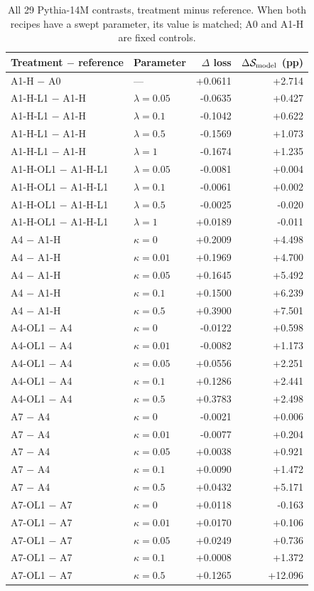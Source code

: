 \begin{table}[p]\centering\small\renewcommand{\arraystretch}{0.95}
\caption{All 29 Pythia-14M contrasts, treatment minus reference. When both recipes have a swept parameter, its value is matched; A0 and A1-H are fixed controls.}\label{tab:paired-effects-full}
\begin{tabular}{@{}llrr@{}}
\toprule
Treatment $-$ reference & Parameter & $\Delta$ loss & $\Delta\mathcal{S}_{\mathrm{model}}$ (pp) \\
\midrule
A1-H $-$ A0 & --- & +0.0611 & +2.714 \\
A1-H-L1 $-$ A1-H & $\lambda=0.05$ & -0.0635 & +0.427 \\
A1-H-L1 $-$ A1-H & $\lambda=0.1$ & -0.1042 & +0.622 \\
A1-H-L1 $-$ A1-H & $\lambda=0.5$ & -0.1569 & +1.073 \\
A1-H-L1 $-$ A1-H & $\lambda=1$ & -0.1674 & +1.235 \\
A1-H-OL1 $-$ A1-H-L1 & $\lambda=0.05$ & -0.0081 & +0.004 \\
A1-H-OL1 $-$ A1-H-L1 & $\lambda=0.1$ & -0.0061 & +0.002 \\
A1-H-OL1 $-$ A1-H-L1 & $\lambda=0.5$ & -0.0025 & -0.020 \\
A1-H-OL1 $-$ A1-H-L1 & $\lambda=1$ & +0.0189 & -0.011 \\
A4 $-$ A1-H & $\kappa=0$ & +0.2009 & +4.498 \\
A4 $-$ A1-H & $\kappa=0.01$ & +0.1969 & +4.700 \\
A4 $-$ A1-H & $\kappa=0.05$ & +0.1645 & +5.492 \\
A4 $-$ A1-H & $\kappa=0.1$ & +0.1500 & +6.239 \\
A4 $-$ A1-H & $\kappa=0.5$ & +0.3900 & +7.501 \\
A4-OL1 $-$ A4 & $\kappa=0$ & -0.0122 & +0.598 \\
A4-OL1 $-$ A4 & $\kappa=0.01$ & -0.0082 & +1.173 \\
A4-OL1 $-$ A4 & $\kappa=0.05$ & +0.0556 & +2.251 \\
A4-OL1 $-$ A4 & $\kappa=0.1$ & +0.1286 & +2.441 \\
A4-OL1 $-$ A4 & $\kappa=0.5$ & +0.3783 & +2.498 \\
A7 $-$ A4 & $\kappa=0$ & -0.0021 & +0.006 \\
A7 $-$ A4 & $\kappa=0.01$ & -0.0077 & +0.204 \\
A7 $-$ A4 & $\kappa=0.05$ & +0.0038 & +0.921 \\
A7 $-$ A4 & $\kappa=0.1$ & +0.0090 & +1.472 \\
A7 $-$ A4 & $\kappa=0.5$ & +0.0432 & +5.171 \\
A7-OL1 $-$ A7 & $\kappa=0$ & +0.0118 & -0.163 \\
A7-OL1 $-$ A7 & $\kappa=0.01$ & +0.0170 & +0.106 \\
A7-OL1 $-$ A7 & $\kappa=0.05$ & +0.0249 & +0.736 \\
A7-OL1 $-$ A7 & $\kappa=0.1$ & +0.0008 & +1.372 \\
A7-OL1 $-$ A7 & $\kappa=0.5$ & +0.1265 & +12.096 \\
\bottomrule
\end{tabular}
\end{table}
